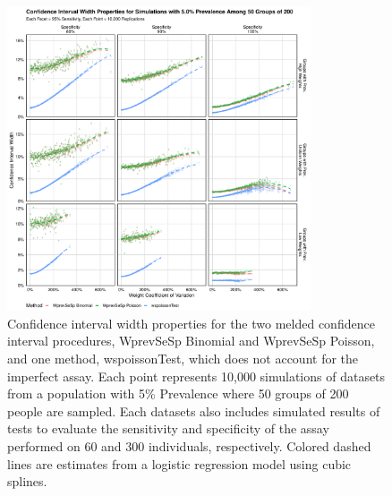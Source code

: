 \documentclass[AMA,STIX1COL]{WileyNJD-v2}
\begin{document}
\begin{figure}
\centering
\includegraphics[width=0.8\textwidth]{figures/imperfect_confidence_interval_width_50_groups_0_05_prev}
\caption{Confidence interval width properties for the two melded confidence interval procedures, WprevSeSp Binomial and WprevSeSp Poisson, and one method, wspoissonTest, which does not account for the imperfect assay.
Each point represents 10,000 simulations of datasets from a population with 5\% Prevalence where 50 groups of 200 people are sampled.
Each datasets also includes simulated results of tests to evaluate the sensitivity and specificity of the assay performed on 60 and 300 individuals, respectively.
Colored dashed lines are estimates from a logistic regression model using cubic splines.}
\label{fig:imperfect_confidence_interval_width_50_groups_0_05_prev}
\end{figure}
\end{document}
